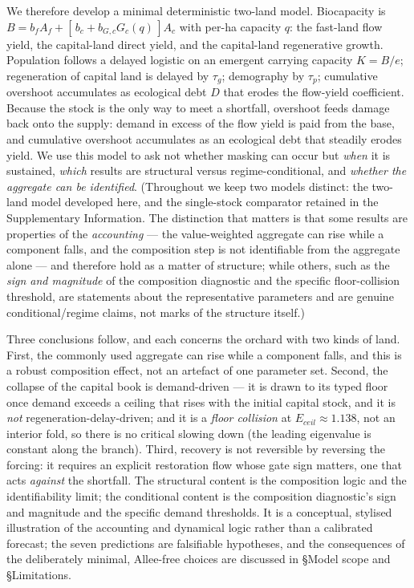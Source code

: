 \documentclass[11pt]{article}
\begin{document}
We therefore develop a minimal deterministic two-land model. Biocapacity is $B=b_f A_f + [\,b_c + b_{G,c}G_c(q)\,]A_c$ with per-ha capacity $q$: the fast-land flow yield, the capital-land direct yield, and the capital-land regenerative growth. Population follows a delayed logistic on an emergent carrying capacity $K=B/e$; regeneration of capital land is delayed by $\tau_g$; demography by $\tau_p$; cumulative overshoot accumulates as ecological debt $D$ that erodes the flow-yield coefficient. Because the stock is the only way to meet a shortfall, overshoot feeds damage back onto the supply: demand in excess of the flow yield is paid from the base, and cumulative overshoot accumulates as an ecological debt that steadily erodes yield. We use this model to ask not whether masking can occur but \emph{when} it is sustained, \emph{which} results are structural versus regime-conditional, and \emph{whether the aggregate can be identified}. (Throughout we keep two models distinct: the two-land model developed here, and the single-stock comparator retained in the Supplementary Information. The distinction that matters is that some results are properties of the \emph{accounting} --- the value-weighted aggregate can rise while a component falls, and the composition step is not identifiable from the aggregate alone --- and therefore hold as a matter of structure; while others, such as the \emph{sign and magnitude} of the composition diagnostic and the specific floor-collision threshold, are statements about the representative parameters and are genuine conditional/regime claims, not marks of the structure itself.)

Three conclusions follow, and each concerns the orchard with two kinds of land. First, the commonly used aggregate can rise while a component falls, and this is a robust composition effect, not an artefact of one parameter set. Second, the collapse of the capital book is demand-driven --- it is drawn to its typed floor once demand exceeds a ceiling that rises with the initial capital stock, and it is \emph{not} regeneration-delay-driven; and it is a \emph{floor collision} at $E_{ceil}\approx1.138$, not an interior fold, so there is no critical slowing down (the leading eigenvalue is constant along the branch). Third, recovery is not reversible by reversing the forcing: it requires an explicit restoration flow whose gate sign matters, one that acts \emph{against} the shortfall. The structural content is the composition logic and the identifiability limit; the conditional content is the composition diagnostic's sign and magnitude and the specific demand thresholds. It is a conceptual, stylised illustration of the accounting and dynamical logic rather than a calibrated forecast; the seven predictions are falsifiable hypotheses, and the consequences of the deliberately minimal, Allee-free choices are discussed in \S Model scope and \S Limitations.
\end{document}
